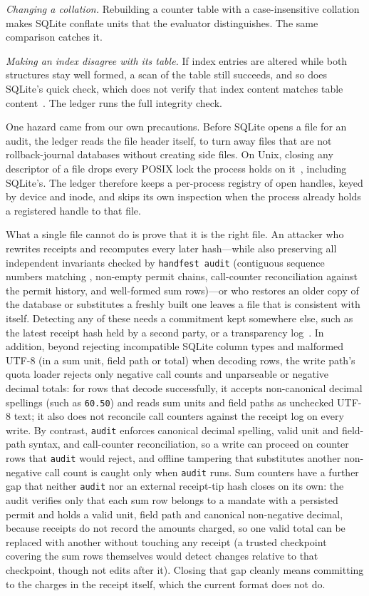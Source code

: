 \documentclass[10pt,twocolumn]{article}
\theoremstyle{plain}
\theoremstyle{definition}
\begin{document}
\emph{Changing a collation.} Rebuilding a counter table with a case-insensitive collation makes SQLite conflate units that the evaluator distinguishes. The same comparison catches it.

\emph{Making an index disagree with its table.} If index entries are altered while both structures stay well formed, a scan of the table still succeeds, and so does SQLite's quick check, which does not verify that index content matches table content~\cite{sqlite_pragma}. The ledger runs the full integrity check.

One hazard came from our own precautions. Before SQLite opens a file for an audit, the ledger reads the file header itself, to turn away files that are not rollback-journal databases without creating side files. On Unix, closing any descriptor of a file drops every POSIX lock the process holds on it~\cite{sqlite_corrupt}, including SQLite's. The ledger therefore keeps a per-process registry of open  handles, keyed by device and inode, and skips its own inspection when the process already holds a registered handle to that file.

What a single file cannot do is prove that it is the right file. An attacker who rewrites receipts and recomputes every later hash---while also preserving all independent invariants checked by \texttt{handfest audit} (contiguous sequence numbers matching , non-empty permit chains, call-counter reconciliation against the permit history, and well-formed sum rows)---or who restores an older copy of the database or substitutes a freshly built one leaves a file that is consistent with itself. Detecting any of these needs a commitment kept somewhere else, such as the latest receipt hash held by a second party, or a transparency log~\cite{rfc6962}. In addition, beyond rejecting incompatible SQLite column types and malformed UTF-8 (in a sum unit, field path or total) when decoding rows, the write path's quota loader rejects only negative call counts and unparseable or negative decimal totals: for rows that decode successfully, it accepts non-canonical decimal spellings (such as \texttt{60.50}) and reads sum units and field paths as unchecked UTF-8 text; it also does not reconcile call counters against the receipt log on every write. By contrast, \texttt{audit} enforces canonical decimal spelling, valid unit and field-path syntax, and call-counter reconciliation, so a write can proceed on counter rows that \texttt{audit} would reject, and offline tampering that substitutes another non-negative call count is caught only when \texttt{audit} runs. Sum counters have a further gap that neither \texttt{audit} nor an external receipt-tip hash closes on its own: the audit verifies only that each sum row belongs to a mandate with a persisted permit and holds a valid unit, field path and canonical non-negative decimal, because receipts do not record the amounts charged, so one valid total can be replaced with another without touching any receipt (a trusted checkpoint covering the sum rows themselves would detect changes relative to that checkpoint, though not edits after it). Closing that gap cleanly means committing to the charges in the receipt itself, which the current format does not do.
\end{document}
